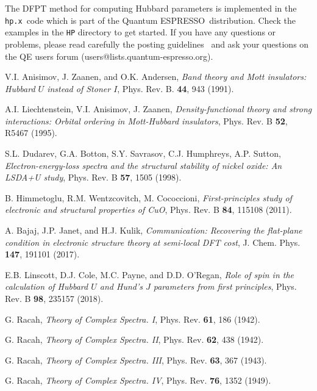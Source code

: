 \documentclass[12pt,a4paper]{article}
\def\qe{{\sc Quantum ESPRESSO}}
\def\hp{\texttt{hp.x}}
\begin{document}
The DFPT method for computing Hubbard parameters is implemented in the \hp\ code which is part of the \qe\ distribution. Check the examples in the \texttt{HP} directory to get started. If you have any questions or problems, please read carefully the posting guidelines~\cite{QE} and ask your questions on the QE users forum (users@lists.quantum-espresso.org). 

  
\begin{thebibliography}{100}
  
   V.I. Anisimov, J. Zaanen, and O.K. Andersen, \textit{Band theory and Mott insulators: Hubbard $U$ instead of Stoner $I$}, Phys. Rev. B. {\bf 44}, 943 (1991).
  
   A.I. Liechtenstein, V.I. Anisimov, J. Zaanen, \textit{Density-functional theory and strong interactions: Orbital ordering in Mott-Hubbard insulators}, Phys. Rev. B {\bf 52}, R5467 (1995).
  
   S.L. Dudarev, G.A. Botton, S.Y. Savrasov, C.J. Humphreys, A.P. Sutton, \textit{Electron-energy-loss spectra and the structural stability of nickel oxide: An LSDA+U study}, Phys. Rev. B {\bf 57}, 1505 (1998).
  
   B. Himmetoglu, R.M. Wentzcovitch, M. Cococcioni, \textit{First-principles study of electronic and structural properties of CuO}, Phys. Rev. B {\bf 84}, 115108 (2011). 
  
   A. Bajaj, J.P. Janet, and H.J. Kulik, \textit{Communication: Recovering the flat-plane condition in electronic structure theory at semi-local DFT cost}, J. Chem. Phys. {\bf 147}, 191101 (2017).
  
   E.B. Linscott, D.J. Cole, M.C. Payne, and D.D. O'Regan, \textit{Role of spin in the calculation of Hubbard $U$ and Hund's $J$ parameters from first principles}, Phys. Rev. B {\bf 98}, 235157 (2018).
  
   G. Racah, \textit{Theory of Complex Spectra. I}, Phys. Rev. {\bf 61}, 186 (1942).
  
   G. Racah, \textit{Theory of Complex Spectra. II}, Phys. Rev. {\bf 62}, 438 (1942).
  
   G. Racah, \textit{Theory of Complex Spectra. III}, Phys. Rev. {\bf 63}, 367 (1943).
  
   G. Racah, \textit{Theory of Complex Spectra. IV}, Phys. Rev. {\bf 76}, 1352 (1949).
  

\end{thebibliography}
\end{document}
